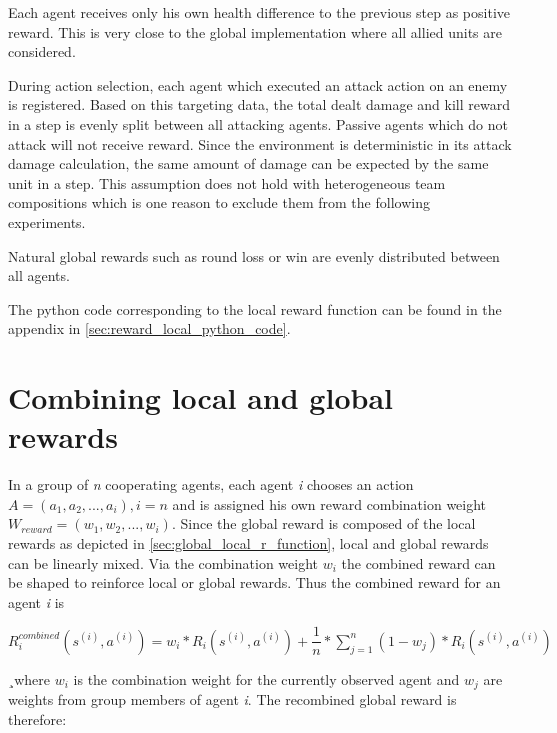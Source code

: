 Each agent receives only his own health difference to the previous step as positive reward. This is very close to the global implementation where all allied units are considered.

During action selection, each agent which executed an attack action on an enemy is registered. Based on this targeting data, the total dealt damage and kill reward in a step is evenly split between all attacking agents. Passive agents which do not attack will not receive reward. Since the environment is deterministic in its attack damage calculation, the same amount of damage can be expected by the same unit in a step. This assumption does not hold with heterogeneous team compositions which is one reason to exclude them from the following experiments.

Natural global rewards such as round loss or win are evenly distributed between all agents.

The python code corresponding to the local reward function  can be found in the appendix in \autoref{sec:reward_local_python_code}.

\section{Combining local and global rewards}

In a group of \textit{n} cooperating agents, each agent \textit{i} chooses an action \newline 
$A = (a_{1},a_{2},...,a_{i}), i = n$ and is assigned his own reward combination weight $W_{reward} = (w_{1},w_{2},...,w_{i})$. Since the global reward is composed of the local rewards as depicted in \autoref{sec:global_local_r_function}, local and global rewards can be linearly mixed. Via the combination weight $w_{i}$ the combined reward can be shaped to reinforce local or global rewards. Thus the combined reward for an agent \textit{i} is


\begin{center}
	$R_{i}^{combined}\left(s^{(i)}, a^{(i)}\right) = w_{i} * R_{i}\left(s^{(i)}, a^{(i)}\right) + \dfrac{1}{n} * \sum_{j=1}^{n} (1-w_{j}) * R_{i}\left(s^{(i)}, a^{(i)}\right) $
\end{center}

¸where $w_{i}$ is the combination weight for the currently observed agent and $w_{j}$ are weights from group members of agent \textit{i}. The recombined global reward is therefore:

